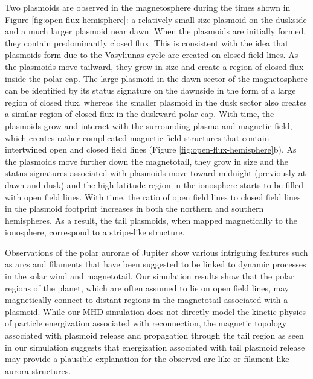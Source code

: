 Two plasmoids are observed in the magnetosphere during the times shown in Figure \ref{fig:open-flux-hemisphere}: a relatively small size plasmoid on the duskside and a much larger plasmoid near dawn. When the plasmoids are initially formed, they contain predominantly closed flux. This is consistent with the idea that plasmoids form due to the Vasyliunas cycle are created on closed field lines. As the plasmoids move tailward, they grow in size and create a region of closed flux inside the polar cap. The large plasmoid in the dawn sector of the magnetosphere can be identified by its status signature on the dawnside in the form of a large region of closed flux, whereas the smaller plasmoid in the dusk sector also creates a similar region of closed flux in the duskward polar cap. With time, the plasmoids grow and interact with the surrounding plasma and magnetic field, which creates rather complicated magnetic field structures that contain intertwined open and closed field lines (Figure \ref{fig:open-flux-hemisphere}b). As the plasmoids move further down the magnetotail, they grow in size and the status signatures associated with plasmoids move toward midnight (previously at dawn and dusk) and the high‐latitude region in the ionosphere starts to be filled with open field lines. With time, the ratio of open field lines to closed field lines in the plasmoid footprint increases in both the northern and southern hemispheres. As a result, the tail plasmoids, when mapped magnetically to the ionosphere, correspond to a stripe‐like structure. 

Observations of the polar aurorae of Jupiter show various intriguing features such as arcs and filaments \cite{Grodent2003a,McComas2007,Nichols2009a} that have been suggested to be linked to dynamic processes in the solar wind and magnetotail. Our simulation results show that the polar regions of the planet, which are often assumed to lie on open field lines, may magnetically connect to distant regions in the magnetotail associated with a plasmoid. While our MHD simulation does not directly model the kinetic physics of particle energization associated with reconnection, the magnetic topology associated with plasmoid release and propagation through the tail region as seen in our simulation suggests that energization associated with tail plasmoid release may provide a plausible explanation for the observed arc‐like or filament‐like aurora structures. 

